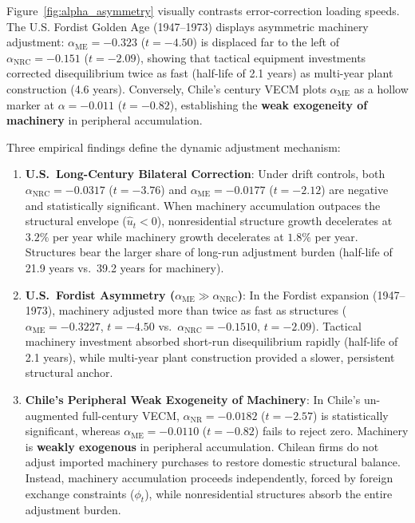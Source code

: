 \documentclass[11pt,a4paper]{article}
\begin{document}
Figure~\ref{fig:alpha_asymmetry} visually contrasts error-correction loading speeds. The U.S. Fordist Golden Age (1947--1973) displays asymmetric machinery adjustment: $\alpha_{\text{ME}} = -0.323$ ($t = -4.50$) is displaced far to the left of $\alpha_{\text{NRC}} = -0.151$ ($t = -2.09$), showing that tactical equipment investments corrected disequilibrium twice as fast (half-life of 2.1 years) as multi-year plant construction (4.6 years). Conversely, Chile's century VECM plots $\alpha_{\text{ME}}$ as a hollow marker at $\alpha = -0.011$ ($t = -0.82$), establishing the \textbf{weak exogeneity of machinery} in peripheral accumulation.

Three empirical findings define the dynamic adjustment mechanism:
\begin{enumerate}
    \item \textbf{U.S.\ Long-Century Bilateral Correction}: Under drift controls, both $\alpha_{\text{NRC}} = -0.0317$ ($t = -3.76$) and $\alpha_{\text{ME}} = -0.0177$ ($t = -2.12$) are negative and statistically significant. When machinery accumulation outpaces the structural envelope ($\hat{u}_t < 0$), nonresidential structure growth decelerates at $3.2\%$ per year while machinery growth decelerates at $1.8\%$ per year. Structures bear the larger share of long-run adjustment burden (half-life of 21.9 years vs.\ 39.2 years for machinery).
    \item \textbf{U.S.\ Fordist Asymmetry ($\alpha_{\text{ME}} \gg \alpha_{\text{NRC}}$)}: In the Fordist expansion (1947--1973), machinery adjusted more than twice as fast as structures ($\alpha_{\text{ME}} = -0.3227$, $t = -4.50$ vs.\ $\alpha_{\text{NRC}} = -0.1510$, $t = -2.09$). Tactical machinery investment absorbed short-run disequilibrium rapidly (half-life of 2.1 years), while multi-year plant construction provided a slower, persistent structural anchor.
    \item \textbf{Chile's Peripheral Weak Exogeneity of Machinery}: In Chile's un-augmented full-century VECM, $\alpha_{\text{NR}} = -0.0182$ ($t = -2.57$) is statistically significant, whereas $\alpha_{\text{ME}} = -0.0110$ ($t = -0.82$) fails to reject zero. Machinery is \textbf{weakly exogenous} in peripheral accumulation. Chilean firms do not adjust imported machinery purchases to restore domestic structural balance. Instead, machinery accumulation proceeds independently, forced by foreign exchange constraints ($\phi_t$), while nonresidential structures absorb the entire adjustment burden.
\end{enumerate}
\end{document}
